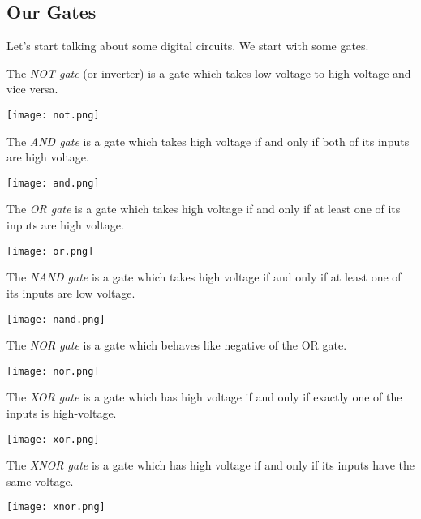 \documentclass[../notes.tex]{subfiles}
\begin{document}
\subsection{Our Gates}
Let's start talking about some digital circuits. We start with some gates.
\begin{definition}
	The \textit{NOT gate} (or inverter) is a gate which takes low voltage to high voltage and vice versa.
	\begin{center}
		\texttt{[image: not.png]}
	\end{center}
\end{definition}
\begin{definition}
	The \textit{AND gate} is a gate which takes high voltage if and only if both of its inputs are high voltage.
	\begin{center}
		\texttt{[image: and.png]}
	\end{center}
\end{definition}
\begin{definition}[OR gate]
	The \textit{OR gate} is a gate which takes high voltage if and only if at least one of its inputs are high voltage.
	\begin{center}
		\texttt{[image: or.png]}
	\end{center}
\end{definition}
\begin{definition}
	The \textit{NAND gate} is a gate which takes high voltage if and only if at least one of its inputs are low voltage.
	\begin{center}
		\texttt{[image: nand.png]}
	\end{center}
\end{definition}
\begin{definition}
	The \textit{NOR gate} is a gate which behaves like negative of the OR gate.
	\begin{center}
		\texttt{[image: nor.png]}
	\end{center}
\end{definition}
\begin{definition}
	The \textit{XOR gate} is a gate which has high voltage if and only if exactly one of the inputs is high-voltage.
	\begin{center}
		\texttt{[image: xor.png]}
	\end{center}
\end{definition}
\begin{definition}
	The \textit{XNOR gate} is a gate which has high voltage if and only if its inputs have the same voltage.
	\begin{center}
		\texttt{[image: xnor.png]}
	\end{center}
\end{definition}
\end{document}
